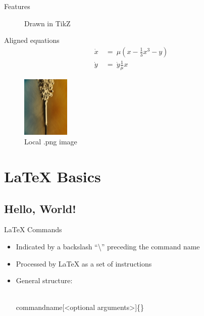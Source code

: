 \documentclass{beamer}
\begin{document}
\begin{frame}{Features}
\begin{multicols}{3}
\begin{figure}
{
			}
		\caption{Drawn in TikZ}
		\end{figure}
	\columnbreak
	Aligned equations\vspace{-1cm}
		\begin{align*}
			\dot x\ &=\ \mu\left(x-\frac13x^3-y\right)\\
			\dot y\ &=\ \dot y\frac1{\mu}x
		\end{align*}
	\columnbreak
		\begin{figure}
			\centering
			\includegraphics[width = 0.2\textwidth]{turbulent.png}
			\caption{Local .png image} %
		\end{figure}
	\end{multicols}
\end{frame}

\section{LaTeX Basics} %

\subsection{Hello, World!}

\begin{frame}{LaTeX Commands}
	\begin{itemize}
		\item Indicated by a backslash ``\textbackslash'' preceding the command name
		\item Processed by LaTeX as a set of instructions
		\item General structure:
			\begin{semiverbatim}
				\\commandname[<optional arguments>]\{<mandatory arguments>\}
			\end{semiverbatim}
	\end{itemize}
\end{frame}
\end{document}
